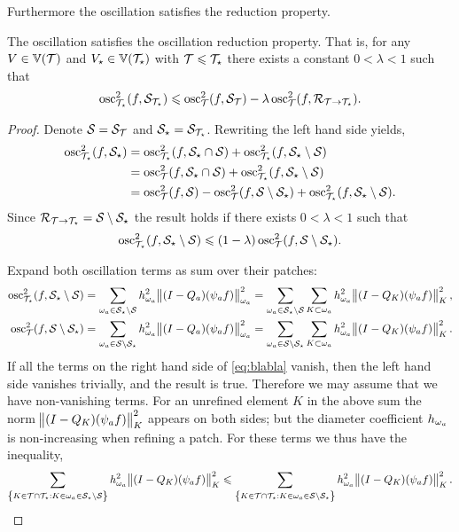 \documentclass[thesis.tex]{subfiles}
\begin{document}
Furthermore the oscillation satisfies the reduction property.
\begin{lem}
  \label{lem:oscasum}
  The oscillation satisfies the oscillation reduction property. That is, for any $V \in \mathbb{V}(\mathcal{T})$ and $V_\star \in \mathbb{V}(\mathcal{T}_\star)$ with $\mathcal{T} \leqslant \mathcal{T}_\star$  there exists a constant $0 < \lambda < 1$ such that
  \[
    \operatorname{osc}_{\mathcal{T}_\star}^2(f, \mathcal{S}_{\mathcal{T}_\star}) \leqslant \operatorname{osc}^2_{\mathcal{T}}(f, \mathcal{S}_{\mathcal{T}}) - \lambda \operatorname{osc}^2_{\mathcal{T}}(f, \mathcal{R}_{\mathcal{T} \to \mathcal{T}_\star}).
  \]
\end{lem}
\begin{proof}
  Denote $\mathcal{S} = \mathcal{S}_{\mathcal{T}}$ and $\mathcal{S}_\star = \mathcal{S}_{\mathcal{T}_\star}$. Rewriting the left hand side yields,
  \begin{align*}
    \operatorname{osc}_{\mathcal{T}_\star}^2(f, \mathcal{S}_\star) &= \operatorname{osc}^2_{\mathcal{T}_\star}(f, \mathcal{S}_\star \cap \mathcal{S}) + \operatorname{osc}^2_{\mathcal{T}_\star}(f, \mathcal{S}_\star \setminus \mathcal{S})\\
    &= \operatorname{osc}^2_{\mathcal{T}}(f, \mathcal{S}_\star \cap \mathcal{S}) + \operatorname{osc}^2_{\mathcal{T}_\star}(f, \mathcal{S}_\star \setminus \mathcal{S})\\
    &= \operatorname{osc}^2_{\mathcal{T}}(f, \mathcal{S}) - \operatorname{osc}^2_{\mathcal{T}}(f, \mathcal{S} \setminus \mathcal{S}_\star) + \operatorname{osc}_{\mathcal{T}_\star}^2(f, \mathcal{S}_\star \setminus \mathcal{S}).
  \end{align*}
  Since $\mathcal{R}_{\mathcal{T} \to \mathcal{T}_\star} = \mathcal{S} \setminus \mathcal{S}_\star$ the result holds if there exists $0 < \lambda < 1$ such that
  \begin{equation}
    \label{eq:blabla}
    \operatorname{osc}_{\mathcal{T}_\star}^2(f, \mathcal{S}_\star \setminus \mathcal{S}) \leqslant (1 - \lambda) \operatorname{osc}_{\mathcal{T}}^2(f, \mathcal{S}\setminus \mathcal{S}_\star).
  \end{equation}
  
  Expand both oscillation terms as sum over their patches:
  \begin{align*}
    \operatorname{osc}_{\mathcal{T}_\star}^2(f,\mathcal{S}_\star \setminus \mathcal{S}) &= \sum_{\omega_a \in \mathcal{S}_\star \setminus \mathcal{S}} h_{\omega_a}^2 \norm{(I-Q_a)(\psi_a f)}^2_{\omega_a} =
    \sum_{\omega_a \in \mathcal{S}_\star \setminus \mathcal{S}} \sum_{K \subset \omega_a} h_{\omega_a}^2 \norm{(I-Q_K)(\psi_a f)}_{K}^2,\\
    \operatorname{osc}_{\mathcal{T}}^2(f,\mathcal{S} \setminus \mathcal{S}_\star) &= \sum_{\omega_a \in \mathcal{S} \setminus \mathcal{S}_\star} h_{\omega_a}^2 \norm{(I-Q_a)(\psi_a f)}^2_{\omega_a} =
    \sum_{\omega_a \in \mathcal{S} \setminus \mathcal{S}_\star} \sum_{K \subset \omega_a} h_{\omega_a}^2 \norm{(I-Q_K)(\psi_a f)}_{K}^2.
  \end{align*}
  If all the terms on the right hand side of \eqref{eq:blabla} vanish, then the left hand side vanishes trivially, and the result 
  is true. Therefore we may assume that we have non-vanishing terms. For an unrefined element $K$ in the above sum the
  norm $\norm{(I - Q_K)(\psi_a f)}_K^2$ appears on both sides; but the diameter coefficient $h_{\omega_a}$ is non-increasing
  when refining a patch. For these terms we thus have the inequality,
  \[
    \sum_{\set{K \in \mathcal{T}\cap \mathcal{T}_\star : K \in \omega_a \in \mathcal{S}_\star \setminus \mathcal{S}}} h_{\omega_a}^2 \norm{(I-Q_K)(\psi_af)}^2_K \leqslant
    \sum_{\set{K \in \mathcal{T}\cap \mathcal{T}_\star : K \in \omega_a \in \mathcal{S}\setminus \mathcal{S}_\star}} h_{\omega_a}^2 \norm{(I-Q_K)(\psi_af)}^2_K.
  \]


\end{proof}
\end{document}
